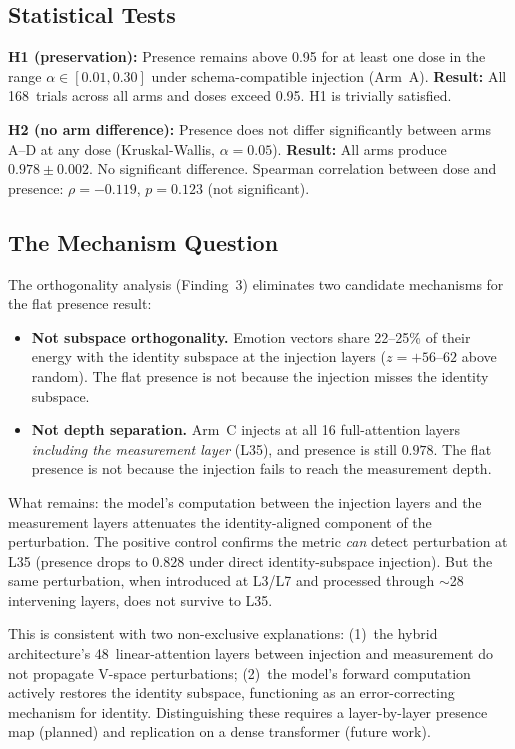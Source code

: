 \documentclass[11pt,a4paper]{article}
\begin{document}
\subsection{Statistical Tests}

\textbf{H1 (preservation):} Presence remains above 0.95 for at least one
dose in the range $\alpha \in [0.01, 0.30]$ under schema-compatible
injection (Arm~A). \textbf{Result:} All 168~trials across all arms and
doses exceed 0.95. H1 is trivially satisfied.

\textbf{H2 (no arm difference):} Presence does not differ significantly
between arms A--D at any dose (Kruskal-Wallis, $\alpha = 0.05$).
\textbf{Result:} All arms produce $0.978 \pm 0.002$. No significant
difference. Spearman correlation between dose and presence:
$\rho{=}{-}0.119$, $p{=}0.123$ (not significant).

\subsection{The Mechanism Question}

The orthogonality analysis (Finding~3) eliminates two candidate mechanisms
for the flat presence result:

\begin{itemize}[nosep]
  \item \textbf{Not subspace orthogonality.} Emotion vectors share
    22--25\% of their energy with the identity subspace at the injection
    layers ($z{=}{+}56$--$62$ above random). The flat presence is not
    because the injection misses the identity subspace.
  \item \textbf{Not depth separation.} Arm~C injects at all 16
    full-attention layers \emph{including the measurement layer} (L35),
    and presence is still $0.978$. The flat presence is not because the
    injection fails to reach the measurement depth.
\end{itemize}

What remains: the model's computation between the injection layers and
the measurement layers attenuates the identity-aligned component of the
perturbation. The positive control confirms the metric \emph{can} detect
perturbation at L35 (presence drops to $0.828$ under direct
identity-subspace injection). But the same perturbation, when introduced
at L3/L7 and processed through $\sim$28 intervening layers, does not
survive to L35.

This is consistent with two non-exclusive explanations: (1)~the hybrid
architecture's 48~linear-attention layers between injection and measurement
do not propagate V-space perturbations; (2)~the model's forward computation
actively restores the identity subspace, functioning as an error-correcting
mechanism for identity. Distinguishing these requires a layer-by-layer
presence map (planned) and replication on a dense transformer (future work).
\end{document}
